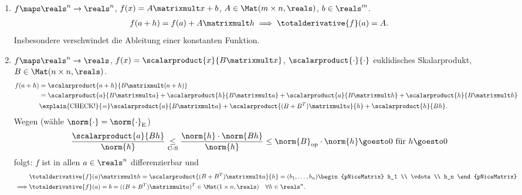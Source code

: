 \begin{beispiele*}
    \begin{enumerate}
        \item \( f\maps \reals^n\to \reals^n \), \( f(x)=A\matrixmult x+b \), \( A\in \Mat(m\times n, \reals) \), \( b\in \reals^m \).
        \begin{align*}
            f(a+h)=f(a)+A\matrixmult h\implies \totalderivative{f}(a)=A.
        \end{align*}
        Insbesondere verschwindet die Ableitung einer konstanten Funktion.
    \item \( f\maps \reals^n \to \reals\), \( f(x)=\scalarproduct{x}{B\matrixmult x} \), \( \scalarproduct{\cdot}{\cdot} \) euklidisches Skalarprodukt, \( B\in \Mat(n\times n, \reals) \).
    \begin{align*}
        f(a+h)\begin{aligned}[t]
            &=\scalarproduct{a+h}{B\matrixmult (a+h)}\\
            &=\scalarproduct{a}{B\matrixmult a}+\scalarproduct{h}{B\matrixmult a}+\scalarproduct{a}{B\matrixmult h}+\scalarproduct{h}{B\matrixmult h}\\
            &\explain{\text{CHECK!}}{=}\scalarproduct{a}{B\matrixmult a}+\scalarproduct{(B+B^T)\matrixmult a}{h}+\scalarproduct{h}{Bh}. 
        \end{aligned}                
    \end{align*}
    Wegen (wähle \( \norm{\cdot}=\norm{\cdot}_{\text{E}} \))
    \begin{align*}
        \frac{\scalarproduct{a}{Bh}}{\norm{h}}\underset{\text{C-S}}{\leq}\frac{\norm{h}\cdot\norm{Bh}}{\norm{h}}\leq \norm{B}_{\text{op}}\cdot\norm{h}\goesto 0  \text{ für }h\goesto 0
    \end{align*}
    folgt: \( f \) ist in allen \( a\in \reals^n \) differenzierbar und
    \begin{align*}
        &\totalderivative{f}(a)\matrixmult h=\scalarproduct{(B+B^T)\matrixmult a}{h}=(b_1,\dots,b_n)\begin{pNiceMatrix} h_1 \\ \vdots \\ h_n \end{pNiceMatrix}\\
        \implies &\totalderivative{f}(a)=b=((B+B^T)\matrixmult a)^T\in \Mat(1\times n,\reals)\quad \forall h\in \reals^n. 
    \end{align*}
    \end{enumerate}
\end{beispiele*}
